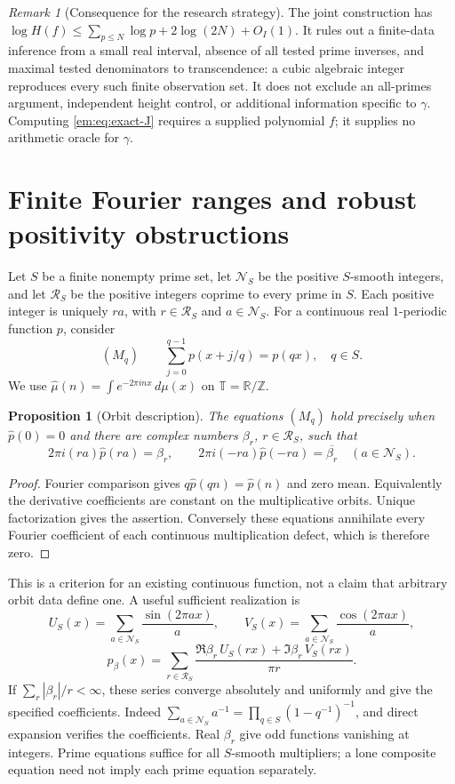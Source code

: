 \documentclass[11pt,a4paper]{article}
\newcommand{\Z}{\mathbb Z}
\newtheorem{proposition}[theorem]{Proposition}
\theoremstyle{definition}
\theoremstyle{remark}
\newtheorem{remark}[theorem]{Remark}
\theoremstyle{plain}
\numberwithin{equation}{section}
\begin{document}
\begin{remark}[Consequence for the research strategy]\label{em:finite-camouflage-scope}
The joint construction has
$\log H(f)\le\sum_{p\le N}\log p+2\log(2N)+O_I(1)$.
It rules out a finite-data inference from a small real interval,
absence of all tested prime inverses, and maximal tested denominators
to transcendence: a cubic algebraic integer reproduces every such
finite observation set.  It does not exclude an all-primes argument,
independent height control, or additional information specific to
$\gamma$.  Computing \eqref{em:eq:exact-J} requires a supplied polynomial
$f$; it supplies no arithmetic oracle for $\gamma$.
\end{remark}

\section{Finite Fourier ranges and robust positivity obstructions}

Let $S$ be a finite nonempty prime set, let $\mathcal N_S$ be the positive
$S$-smooth integers, and let $\mathcal R_S$ be the positive integers
coprime to every prime in $S$. Each positive integer is uniquely $ra$,
with $r\in\mathcal R_S$ and $a\in\mathcal N_S$.
For a continuous real $1$-periodic function $p$, consider
\[
 (M_q)\qquad \sum_{j=0}^{q-1}p(x+j/q)=p(qx),\quad q\in S.
\]
We use $\widehat\mu(n)=\int e^{-2\pi inx}\,d\mu(x)$ on $\mathbb T=\mathbb R/\Z$.

\begin{proposition}[Orbit description]
The equations $(M_q)$ hold precisely when $\widehat p(0)=0$ and there
are complex numbers $\beta_r$, $r\in\mathcal R_S$, such that
\[
 2\pi i(ra)\widehat p(ra)=\beta_r,
 \qquad
 2\pi i(-ra)\widehat p(-ra)=\overline{\beta_r}
 \quad(a\in\mathcal N_S).
\]
\end{proposition}
\begin{proof}
Fourier comparison gives $q\widehat p(qn)=\widehat p(n)$ and zero
mean. Equivalently the derivative coefficients are constant on the
multiplicative orbits. Unique factorization gives the assertion.
Conversely these equations annihilate every Fourier coefficient of
each continuous multiplication defect, which is therefore zero.
\end{proof}

This is a criterion for an existing continuous function, not a claim
that arbitrary orbit data define one. A useful sufficient realization is
\[
 U_S(x)=\sum_{a\in\mathcal N_S}\frac{\sin(2\pi ax)}a,
 \qquad V_S(x)=\sum_{a\in\mathcal N_S}\frac{\cos(2\pi ax)}a,
\]
\[
 p_\beta(x)=\sum_{r\in\mathcal R_S}
 \frac{\Re\beta_r\,U_S(rx)+\Im\beta_r\,V_S(rx)}{\pi r}.
\]
If $\sum_r|\beta_r|/r<\infty$, these series converge absolutely and
uniformly and give the specified coefficients. Indeed
$\sum_{a\in\mathcal N_S}a^{-1}=\prod_{q\in S}(1-q^{-1})^{-1}$,
and direct expansion verifies the coefficients. Real $\beta_r$ give
odd functions vanishing at integers. Prime equations suffice for all
$S$-smooth multipliers; a lone composite equation need not imply each
prime equation separately.
\end{document}
